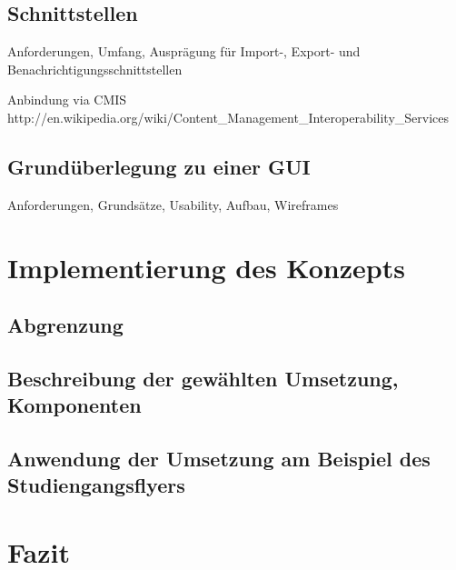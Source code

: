 \documentclass[11pt,a4paper]{article}
\begin{document}
\subsection{Schnittstellen}

Anforderungen, Umfang, Ausprägung für Import-, Export- und Benachrichtigungsschnittstellen

Anbindung via CMIS http://en.wikipedia.org/wiki/Content\_Management\_Interoperability\_Services

\subsection{Grundüberlegung zu einer GUI}

Anforderungen, Grundsätze, Usability, Aufbau, Wireframes

\section{Implementierung des Konzepts}

\subsection{Abgrenzung}
\subsection{Beschreibung der gewählten Umsetzung, Komponenten}

\subsection{Anwendung der Umsetzung am Beispiel des Studiengangsflyers}

\section{Fazit}

\pagebreak


\end{document}

